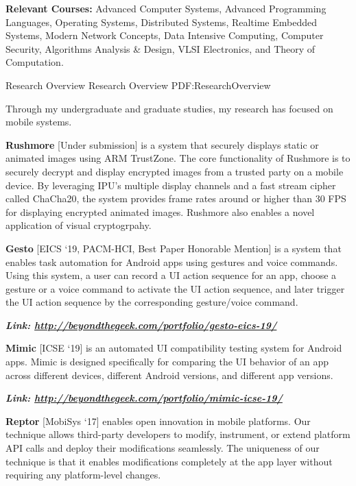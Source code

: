 \documentclass[letterpaper,MMMyyyy,nonstopmode]{simpleresumecv}
\begin{document}
\begin{Body}
\BigGap
\Entry
\textbf{Relevant Courses:} Advanced Computer Systems, Advanced Programming Languages, 
Operating Systems, Distributed Systems, Realtime Embedded Systems, Modern Network Concepts, 
Data Intensive Computing, Computer Security, Algorithms Analysis \& Design,
VLSI Electronics, and Theory of Computation.


\Section
{Research Overview}
{Research Overview}
{PDF:ResearchOverview}

\Entry
Through my undergraduate and graduate studies, my research has focused on mobile systems.

\Gap
\BulletItem
\textbf{Rushmore} [Under submission] is a system that securely displays static or animated images 
using ARM TrustZone. The core functionality of Rushmore is to securely decrypt and display encrypted 
images from a trusted party on a mobile device. By leveraging IPU's multiple display channels and
a fast stream cipher called ChaCha20, the system provides frame rates around or higher than 30 FPS 
for displaying encrypted animated images. Rushmore also enables a novel application of visual 
cryptogrpahy.
\hfill

\Gap
\BulletItem
\textbf{Gesto} [EICS `19, PACM-HCI, Best Paper Honorable Mention] is a system that enables task 
automation for Android apps using gestures 
and voice commands. Using this system, a user can record a UI action sequence for an app, 
choose a gesture or a voice command to activate the UI action sequence, and later trigger 
the UI action sequence by the corresponding gesture/voice command.

\hspace{2ex}
\textbf{\textit{Link: \href{http://beyondthegeek.com/portfolio/gesto-eics-19/}
{http://beyondthegeek.com/portfolio/gesto-eics-19/}}}
\hfill


\Gap
\BulletItem
\textbf{Mimic} [ICSE `19] is an automated UI compatibility testing system for Android apps. 
Mimic is designed specifically for comparing the UI behavior of an app across different 
devices, different Android versions, and different app versions.

\hspace{2ex}
\textbf{\textit{Link: \href{http://beyondthegeek.com/portfolio/mimic-icse-19/}{http://beyondthegeek.com/portfolio/mimic-icse-19/}}}
\hfill


\Gap
\BulletItem
\textbf{Reptor} [MobiSys `17] enables open innovation in mobile platforms. Our technique allows third-party 
developers to modify, instrument, or extend platform API calls and deploy their modifications 
seamlessly. The uniqueness of our technique is that it enables modifications completely at 
the app layer without requiring any platform-level changes. 


\end{Body}
\end{document}
